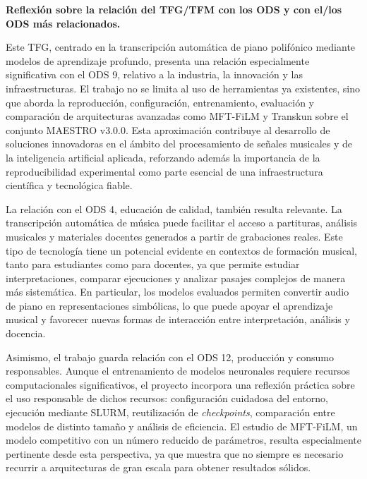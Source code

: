 \documentclass[11pt]{article}
\begin{document}
\newpage

\vspace*{0.5cm}

\noindent\textbf{Reflexi\'on sobre la relaci\'on del TFG/TFM con los ODS y con el/los ODS m\'as relacionados.}


Este TFG, centrado en la transcripción automática de piano polifónico mediante modelos de aprendizaje profundo, presenta una relación especialmente significativa con el ODS 9, relativo a la industria, la innovación y las infraestructuras. El trabajo no se limita al uso de herramientas ya existentes, sino que aborda la reproducción, configuración, entrenamiento, evaluación y comparación de arquitecturas avanzadas como MFT-FiLM y Transkun sobre el conjunto MAESTRO v3.0.0. Esta aproximación contribuye al desarrollo de soluciones innovadoras en el ámbito del procesamiento de señales musicales y de la inteligencia artificial aplicada, reforzando además la importancia de la reproducibilidad experimental como parte esencial de una infraestructura científica y tecnológica fiable.

La relación con el ODS 4, educación de calidad, también resulta relevante. La transcripción automática de música puede facilitar el acceso a partituras, análisis musicales y materiales docentes generados a partir de grabaciones reales. Este tipo de tecnología tiene un potencial evidente en contextos de formación musical, tanto para estudiantes como para docentes, ya que permite estudiar interpretaciones, comparar ejecuciones y analizar pasajes complejos de manera más sistemática. En particular, los modelos evaluados permiten convertir audio de piano en representaciones simbólicas, lo que puede apoyar el aprendizaje musical y favorecer nuevas formas de interacción entre interpretación, análisis y docencia.

Asimismo, el trabajo guarda relación con el ODS 12, producción y consumo responsables. Aunque el entrenamiento de modelos neuronales requiere recursos computacionales significativos, el proyecto incorpora una reflexión práctica sobre el uso responsable de dichos recursos: configuración cuidadosa del entorno, ejecución mediante SLURM, reutilización de \textit{checkpoints}, comparación entre modelos de distinto tamaño y análisis de eficiencia. El estudio de MFT-FiLM, un modelo competitivo con un número reducido de parámetros, resulta especialmente pertinente desde esta perspectiva, ya que muestra que no siempre es necesario recurrir a arquitecturas de gran escala para obtener resultados sólidos.
\end{document}
